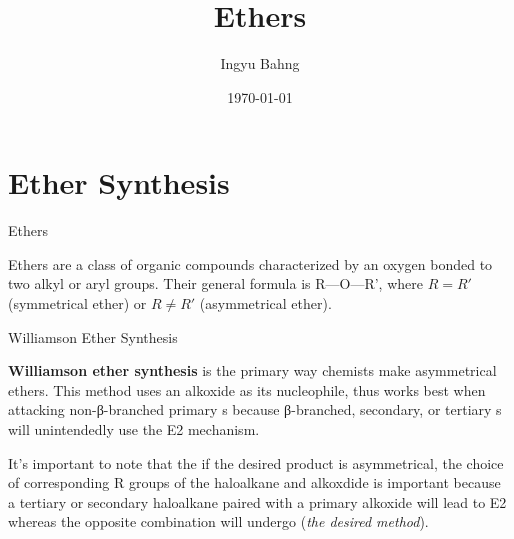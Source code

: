 \documentclass[10pt]{article}
\title{Ethers}
\date{\today}
\author{Ingyu Bahng}
\begin{document}


\section{Ether Synthesis}

  \begin{core}{Ethers}
 
    Ethers are a class of organic compounds characterized by an oxygen bonded to two alkyl or aryl groups. Their general formula is R—O—R', where $R = R'$ (symmetrical ether) or $R \neq R'$ (asymmetrical ether).


  \end{core}

  \begin{core}{Williamson Ether Synthesis}
   
    \textbf{Williamson ether synthesis} is the primary way chemists make asymmetrical ethers. This method uses an alkoxide  as its nucleophile, thus works best when attacking non-β-branched primary s because β-branched, secondary, or tertiary s will unintendedly use the E2 mechanism.


    It's important to note that the if the desired product is asymmetrical, the choice of corresponding R groups of the haloalkane and alkoxdide is important because a tertiary or secondary haloalkane paired with a primary alkoxide will lead to E2 whereas the opposite combination will undergo \snt (\textit{the desired method}).


  \end{core}
  
\end{document}
